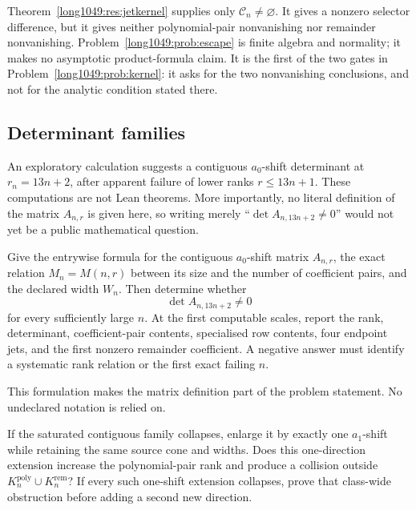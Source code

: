 \documentclass[11pt]{article}
\begin{document}
Theorem~\ref{long1049:res:jetkernel} supplies only $\mathcal C_n\ne\varnothing$.
It gives a nonzero selector difference, but it gives neither polynomial-pair
nonvanishing nor remainder nonvanishing.  Problem~\ref{long1049:prob:escape} is finite
algebra and normality; it makes no asymptotic product-formula claim.  It is the
first of the two gates in Problem~\ref{long1049:prob:kernel}: it asks for the two
nonvanishing conclusions, and not for the analytic condition stated there.

\subsection{Determinant families}

An exploratory calculation suggests a contiguous $a_0$-shift determinant at
$r_n=13n+2$, after apparent failure of lower ranks $r\le13n+1$.  These
computations are not Lean theorems.  More importantly, no literal definition
of the matrix $A_{n,r}$ is given here, so writing merely
“$\det A_{n,13n+2}\ne0$” would not yet be a public mathematical question.

\begin{problem}
Give the entrywise formula for the contiguous $a_0$-shift matrix $A_{n,r}$,
the exact relation $M_n=M(n,r)$ between its size and the number of coefficient
pairs, and the declared width $W_n$.  Then determine whether
\[
 \det A_{n,13n+2}\ne0
\]
for every sufficiently large $n$.  At the first computable scales, report the
rank, determinant, coefficient-pair contents, specialised row contents, four
endpoint jets, and the first nonzero remainder coefficient.  A negative answer
must identify a systematic rank relation or the first exact failing $n$.
\end{problem}

This formulation makes the matrix definition part of the problem statement.  No
undeclared notation is relied on.

\begin{problem}
If the saturated contiguous family collapses, enlarge it by exactly one
$a_1$-shift while retaining the same source cone and widths.  Does this
one-direction extension increase the polynomial-pair rank and produce a
collision outside
$K_n^{\mathrm{poly}}\cup K_n^{\mathrm{rem}}$?  If every such one-shift
extension collapses, prove that class-wide obstruction before adding a second
new direction.
\end{problem}
\end{document}

